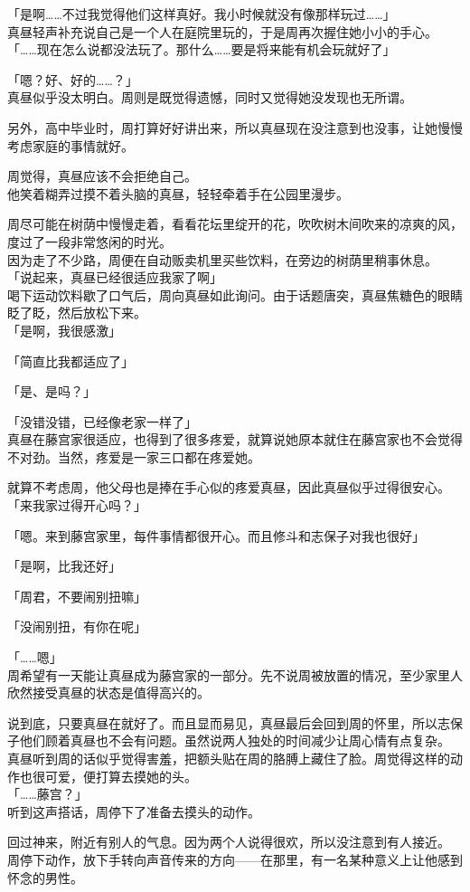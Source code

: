 「是啊……不过我觉得他们这样真好。我小时候就没有像那样玩过……」\\

真昼轻声补充说自己是一个人在庭院里玩的，于是周再次握住她小小的手心。\\

「……现在怎么说都没法玩了。那什么……要是将来能有机会玩就好了」

「嗯？好、好的……？」\\

真昼似乎没太明白。周则是既觉得遗憾，同时又觉得她没发现也无所谓。

另外，高中毕业时，周打算好好讲出来，所以真昼现在没注意到也没事，让她慢慢考虑家庭的事情就好。

周觉得，真昼应该不会拒绝自己。\\

他笑着糊弄过摸不着头脑的真昼，轻轻牵着手在公园里漫步。

周尽可能在树荫中慢慢走着，看看花坛里绽开的花，吹吹树木间吹来的凉爽的风，度过了一段非常悠闲的时光。\\

因为走了不少路，周便在自动贩卖机里买些饮料，在旁边的树荫里稍事休息。\\

「说起来，真昼已经很适应我家了啊」\\

喝下运动饮料歇了口气后，周向真昼如此询问。由于话题唐突，真昼焦糖色的眼睛眨了眨，然后放松下来。\\

「是啊，我很感激」

「简直比我都适应了」

「是、是吗？」

「没错没错，已经像老家一样了」\\

真昼在藤宫家很适应，也得到了很多疼爱，就算说她原本就住在藤宫家也不会觉得不对劲。当然，疼爱是一家三口都在疼爱她。

就算不考虑周，他父母也是捧在手心似的疼爱真昼，因此真昼似乎过得很安心。\\

「来我家过得开心吗？」

「嗯。来到藤宫家里，每件事情都很开心。而且修斗和志保子对我也很好」

「是啊，比我还好」

「周君，不要闹别扭嘛」

「没闹别扭，有你在呢」

「……嗯」\\

周希望有一天能让真昼成为藤宫家的一部分。先不说周被放置的情况，至少家里人欣然接受真昼的状态是值得高兴的。

说到底，只要真昼在就好了。而且显而易见，真昼最后会回到周的怀里，所以志保子他们顾着真昼也不会有问题。虽然说两人独处的时间减少让周心情有点复杂。\\

真昼听到周的话似乎觉得害羞，把额头贴在周的胳膊上藏住了脸。周觉得这样的动作也很可爱，便打算去摸她的头。\\

「……藤宫？」\\

听到这声搭话，周停下了准备去摸头的动作。

回过神来，附近有别人的气息。因为两个人说得很欢，所以没注意到有人接近。\\

周停下动作，放下手转向声音传来的方向——在那里，有一名某种意义上让他感到怀念的男性。
